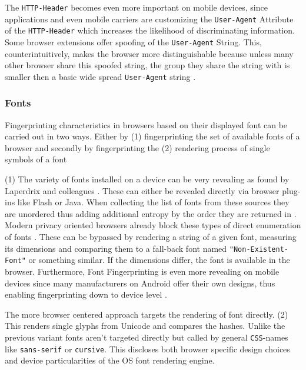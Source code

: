 The \texttt{HTTP-Header} becomes even more important on mobile devices, since applications and even mobile carriers are customizing the \texttt{User-Agent} Attribute of the \texttt{HTTP-Header} which increases the likelihood of discriminating information\cite{laperdrix_beauty_2016}. Some browser extensions offer spoofing of the \texttt{User-Agent} String. This, counterintuitively, makes the browser more distinguishable because unless many other browser share this spoofed string, the group they share the string with is smaller then a basic wide spread \texttt{User-Agent} string \cite{eckersley_how_2010}.


\subsubsection{Fonts}
\label{sota:fonts}
Fingerprinting characteristics in browsers based on their displayed font can be carried out in two ways. Either by (1) fingerprinting the set of available fonts of a browser and secondly by fingerprinting the (2) rendering process of single symbols of a font

(1) The variety of fonts installed on a device can be very revealing as found by Laperdrix and colleagues \cite{laperdrix_beauty_2016}. These can either be revealed directly via browser plug-ins like Flash or Java. When collecting the list of fonts from these sources they are unordered thus adding additional entropy by the order they are returned in \cite{nikiforakis_cookieless_2013}. Modern privacy oriented browsers already block these types of direct enumeration of fonts \cite{fifield_fingerprinting_2015}. These can be bypassed by rendering a string of a given font, measuring its dimensions and comparing them to a fall-back font named \texttt{"Non-Existent-Font"} or something similar. If the dimensions differ, the font is available in the browser. Furthermore, Font Fingerprinting is even more revealing on mobile devices since many manufacturers on Android offer their own designs, thus enabling fingerprinting down to device level \cite{acar_fpdetective_2013}.

The more browser centered approach targets the rendering of font directly. (2) This renders single glyphs from Unicode and compares the hashes. Unlike the previous variant fonts aren't targeted directly but called by general \texttt{CSS}-names like \texttt{sans-serif} or \texttt{cursive}. This discloses both browser specific design choices and device particularities of the OS font rendering engine. \cite{fifield_fingerprinting_2015}

